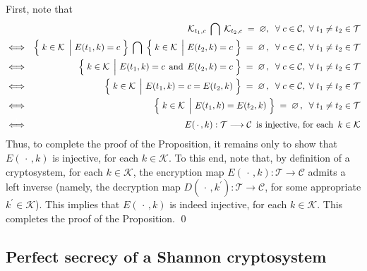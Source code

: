 \proof
First, note that
\begin{eqnarray*}
&&
	\mathcal{K}_{t_{1},c} \;\bigcap\; \mathcal{K}_{t_{2},c} \; = \; \varnothing,
	\;\;\forall\;c \in \mathcal{C}, \;\forall\;t_{1}\neq t_{2}\in\mathcal{T}
\\
& \Longleftrightarrow &
	\left\{\,\left.
		\overset{{\color{white}.}}{k} \in \mathcal{K}
	\;\,\right\vert\,
		E(t_{1},k) = c
	\;\right\}
	\;\bigcap\;
	\left\{\,\left.
		\overset{{\color{white}.}}{k} \in \mathcal{K}
	\;\,\right\vert\,
		E(t_{2},k) = c
	\;\right\}
	\; = \;
	\varnothing\,,
	\;\;\forall\;c \in \mathcal{C}, \;\forall\;t_{1}\neq t_{2}\in\mathcal{T}
\\
& \Longleftrightarrow &
	\left\{\,\left.
		\overset{{\color{white}.}}{k} \in \mathcal{K}
	\;\,\right\vert\,
		E(t_{1},k) = c \;\,\textnormal{and}\;\, E(t_{2},k) = c
	\;\right\}
	\; = \;
	\varnothing\,,
	\;\;\forall\;c \in \mathcal{C}, \;\forall\;t_{1}\neq t_{2}\in\mathcal{T}
\\
& \Longleftrightarrow &
	\left\{\,\left.
		\overset{{\color{white}.}}{k} \in \mathcal{K}
	\;\,\right\vert\,
		E(t_{1},k) = c = E(t_{2},k)
	\;\right\}
	\; = \;
	\varnothing\,,
	\;\;\forall\;c \in \mathcal{C}, \;\forall\;t_{1}\neq t_{2}\in\mathcal{T}
\\
& \Longleftrightarrow &
	\left\{\,\left.
		\overset{{\color{white}.}}{k} \in \mathcal{K}
	\;\,\right\vert\,
		E(t_{1},k) = E(t_{2},k)
	\;\right\}
	\; = \;
	\varnothing\,,
	\;\;\forall\;t_{1}\neq t_{2}\in\mathcal{T}
\\
& \overset{{\color{white}1}}{\Longleftrightarrow} &
	\textnormal{$E(\,\cdot\,,k) : \mathcal{T} \longrightarrow \mathcal{C}$\, is injective, for each \,$k \in \mathcal{K}$}
\end{eqnarray*}
Thus, to complete the proof of the Proposition, it remains only to show that
$E(\,\cdot\,,k)$ is injective, for each $k \in \mathcal{K}$. 
To this end, note that, by definition of a cryptosystem, for each $k \in \mathcal{K}$, the encryption map
$E(\,\cdot\,,k) : \mathcal{T} \longrightarrow \mathcal{C}$
admits a left inverse (namely, the decryption map
$D(\,\cdot\,,k^{\prime}) : \mathcal{T} \longrightarrow \mathcal{C}$,
for some appropriate $k^{\prime}\in\mathcal{K}$).
This implies that $E(\,\cdot\,,k)$ is indeed injective, for each $k \in \mathcal{K}$.
This completes the proof of the Proposition.
\qed

\subsection{Perfect secrecy of a Shannon cryptosystem}

